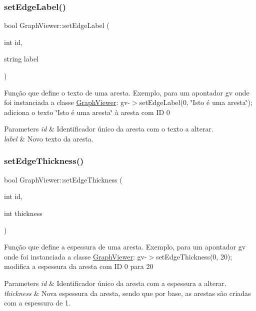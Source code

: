 \subsubsection{\texorpdfstring{set\+Edge\+Label()}{setEdgeLabel()}}
{\footnotesize\ttfamily bool Graph\+Viewer\+::set\+Edge\+Label (\begin{DoxyParamCaption}\item[{int}]{id,  }\item[{string}]{label }\end{DoxyParamCaption})}

Função que define o texto de uma aresta. Exemplo, para um apontador gv onde foi instanciada a classe \hyperlink{class_graph_viewer}{Graph\+Viewer}\+: gv-\/$>$set\+Edge\+Label(0, \char`\"{}\+Isto é uma aresta\char`\"{}); adiciona o texto \char`\"{}\+Isto é uma aresta\char`\"{} à aresta com ID 0


\begin{DoxyParams}{Parameters}
{\em id} & Identificador único da aresta com o texto a alterar. \\
\hline
{\em label} & Novo texto da aresta. \\
\hline
\end{DoxyParams}
\hypertarget{class_graph_viewer_a07f598272fe3515455eab13be749604a}{}\label{class_graph_viewer_a07f598272fe3515455eab13be749604a} 
\subsubsection{\texorpdfstring{set\+Edge\+Thickness()}{setEdgeThickness()}}
{\footnotesize\ttfamily bool Graph\+Viewer\+::set\+Edge\+Thickness (\begin{DoxyParamCaption}\item[{int}]{id,  }\item[{int}]{thickness }\end{DoxyParamCaption})}

Função que define a espessura de uma aresta. Exemplo, para um apontador gv onde foi instanciada a classe \hyperlink{class_graph_viewer}{Graph\+Viewer}\+: gv-\/$>$set\+Edge\+Thickness(0, 20); modifica a espessura da aresta com ID 0 para 20


\begin{DoxyParams}{Parameters}
{\em id} & Identificador único da aresta com a espessura a alterar. \\
\hline
{\em thickness} & Nova espessura da aresta, sendo que por base, as arestas são criadas com a espessura de 1. \\
\hline
\end{DoxyParams}
\hypertarget{class_graph_viewer_ac211de009a0afe2e6d44f4f8d030a2cc}{}\label{class_graph_viewer_ac211de009a0afe2e6d44f4f8d030a2cc} 
